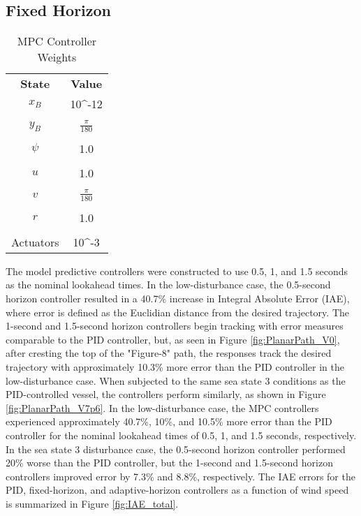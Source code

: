 \documentclass[letterpaper, 10 pt, conference]{ieeeconf}  %
\begin{document}
\subsection{Fixed Horizon}
%
\begin{table}[t!]
\caption{MPC Controller Weights}
\vspace{-0.1in}
\label{tab:mpc_weights}
  \begin{center}
    \begin{tabular}{cc}
    \textbf{State} & \textbf{Value}\\
    $x_B$ & 10^{-12}\\
    \vspace{-0.075in}
    \\
    \vspace{-0.075in}
    $y_B$ & $\frac{\pi}{180}$\\
    \\
    $\psi$ & 1.0\\
    \vspace{-0.075in}
    \\
    $u$ & 1.0\\
    \vspace{-0.075in}
    \\
    $v$ & $\frac{\pi}{180}$\\
    \vspace{-0.075in}
    \\
    $r$ & 1.0\\
    \vspace{-0.075in}
    \\
    Actuators & 10^{-3}
    \end{tabular}
  \end{center}
\end{table}
%
The model predictive controllers were constructed to use 0.5, 1, and 1.5 seconds as the nominal lookahead times. In the low-disturbance case, the 0.5-second horizon controller resulted in a 40.7\% increase in Integral Absolute Error (IAE), where error is defined as the  Euclidian distance from the desired trajectory. The 1-second and 1.5-second horizon controllers begin tracking with error measures comparable to the PID controller, but, as seen in Figure \ref{fig:PlanarPath_V0}, after cresting the top of the "Figure-8" path, the responses track the desired trajectory with approximately 10.3\% more error than the PID controller in the low-disturbance case. When subjected to the same sea state 3 conditions as the PID-controlled vessel, the controllers perform similarly, as shown in Figure \ref{fig:PlanarPath_V7p6}. In the low-disturbance case, the MPC controllers experienced approximately 40.7\%, 10\%, and 10.5\% more error than the PID controller for the nominal lookahead times of 0.5, 1, and 1.5 seconds, respectively. In the sea state 3 disturbance case, the 0.5-second horizon controller performed 20\% worse than the PID controller, but the 1-second and 1.5-second horizon controllers improved error by 7.3\% and 8.8\%, respectively. The IAE errors for the PID, fixed-horizon, and adaptive-horizon controllers as a function of wind speed is summarized in Figure \ref{fig:IAE_total}.
\end{document}
